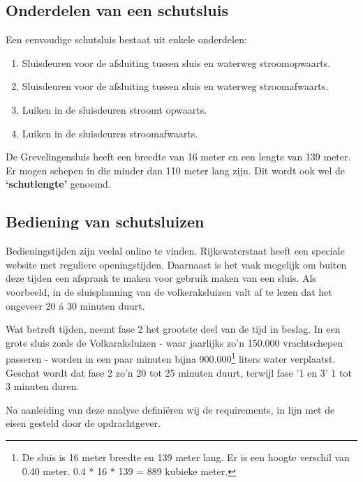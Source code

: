 \documentclass{article} %
\begin{document}
\subsection{Onderdelen van een schutsluis}
Een eenvoudige schutsluis bestaat uit enkele onderdelen:
\begin{enumerate}
    \item Sluisdeuren voor de afsluiting tussen sluis en waterweg stroomopwaarts.
    \item Sluisdeuren voor de afsluiting tussen sluis en waterweg stroomafwaarts.
    \item Luiken in de sluisdeuren stroomt opwaarts.
    \item Luiken in de sluisdeuren stroomafwaarts.
\end{enumerate}
De Grevelingensluis heeft een breedte van 16 meter en een lengte van 139 meter. Er mogen schepen in die minder dan 110 meter lang zijn. Dit wordt ook wel de \textbf{‘schutlengte’} genoemd. \cite{WaterkaartGrevelingensluis}

\subsection{Bediening van schutsluizen}
Bedieningstijden zijn veelal online te vinden. Rijkswaterstaat heeft een speciale website met reguliere openingstijden. Daarnaast is het vaak mogelijk om buiten deze tijden een afspraak te maken voor gebruik maken van een sluis. Als voorbeeld, in de sluisplanning van de volkeraksluizen valt af te lezen dat het ongeveer 20 á 30 minuten duurt. \cite{vaarweginformatie, volkeraksluizen, SluisplanningVolkeraksluizen} \par 

Wat betreft tijden, neemt fase 2 het grootste deel van de tijd in beslag. In een grote sluis zoals de Volkaraksluizen - waar jaarlijks zo’n 150.000 vrachtschepen passeren - worden in een paar minuten bijna 900.000\footnote{De sluis is 16 meter breedte en 139 meter lang. Er is een hoogte verschil van 0.40 meter. 0.4 * 16 * 139 = 889 kubieke meter.} liters water verplaatst. \cite{WaterkaartVolkeraksluizen} Geschat wordt dat fase 2 zo’n 20 tot 25 minuten duurt, terwijl fase '1 en 3' 1 tot 3 minuten duren. \par

Na aanleiding van deze analyse definiëren wij de requirements, in lijn met de eisen gesteld door de opdrachtgever. \par

\newpage
\end{document}
